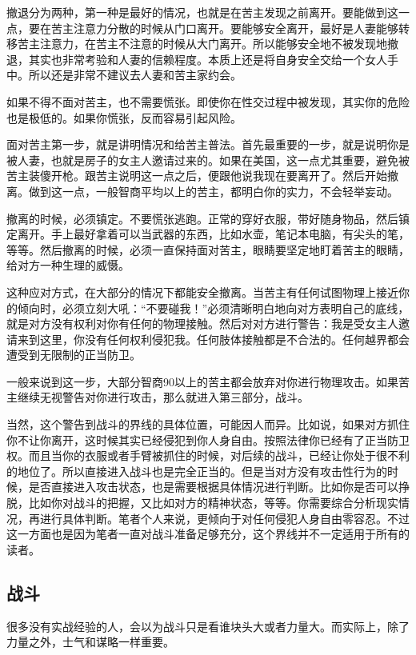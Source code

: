 撤退分为两种，第一种是最好的情况，也就是在苦主发现之前离开。要能做到这一点，要在苦主注意力分散的时候从门口离开。要能够安全离开，最好是人妻能够转移苦主注意力，在苦主不注意的时候从大门离开。所以能够安全地不被发现地撤退，其实也非常考验和人妻的信赖程度。本质上还是将自身安全交给一个女人手中。所以还是非常不建议去人妻和苦主家约会。

如果不得不面对苦主，也不需要慌张。即使你在性交过程中被发现，其实你的危险也是极低的。如果你慌张，反而容易引起风险。

面对苦主第一步，就是讲明情况和给苦主普法。首先最重要的一步，就是说明你是被人妻，也就是房子的女主人邀请过来的。如果在美国，这一点尤其重要，避免被苦主装傻开枪。跟苦主说明这一点之后，便跟他说我现在要离开了。然后开始撤离。做到这一点，一般智商平均以上的苦主，都明白你的实力，不会轻举妄动。

撤离的时候，必须镇定。不要慌张逃跑。正常的穿好衣服，带好随身物品，然后镇定离开。手上最好拿着可以当武器的东西，比如水壶，笔记本电脑，有尖头的笔，等等。然后撤离的时候，必须一直保持面对苦主，眼睛要坚定地盯着苦主的眼睛，给对方一种生理的威慑。

这种应对方式，在大部分的情况下都能安全撤离。当苦主有任何试图物理上接近你的倾向时，必须立刻大吼：``不要碰我！''必须清晰明白地向对方表明自己的底线，就是对方没有权利对你有任何的物理接触。然后对对方进行警告：我是受女主人邀请来到这里，你没有任何权利侵犯我。任何肢体接触都是不合法的。任何越界都会遭受到无限制的正当防卫。

一般来说到这一步，大部分智商90以上的苦主都会放弃对你进行物理攻击。如果苦主继续无视警告对你进行攻击，那么就进入第三部分，战斗。

当然，这个警告到战斗的界线的具体位置，可能因人而异。比如说，如果对方抓住你不让你离开，这时候其实已经侵犯到你人身自由。按照法律你已经有了正当防卫权。而且当你的衣服或者手臂被抓住的时候，对后续的战斗，已经让你处于很不利的地位了。所以直接进入战斗也是完全正当的。但是当对方没有攻击性行为的时候，是否直接进入攻击状态，也是需要根据具体情况进行判断。比如你是否可以挣脱，比如你对战斗的把握，又比如对方的精神状态，等等。你需要综合分析现实情况，再进行具体判断。笔者个人来说，更倾向于对任何侵犯人身自由零容忍。不过这一方面也是因为笔者一直对战斗准备足够充分，这个界线并不一定适用于所有的读者。

\subsection{战斗}

很多没有实战经验的人，会以为战斗只是看谁块头大或者力量大。而实际上，除了力量之外，士气和谋略一样重要。

